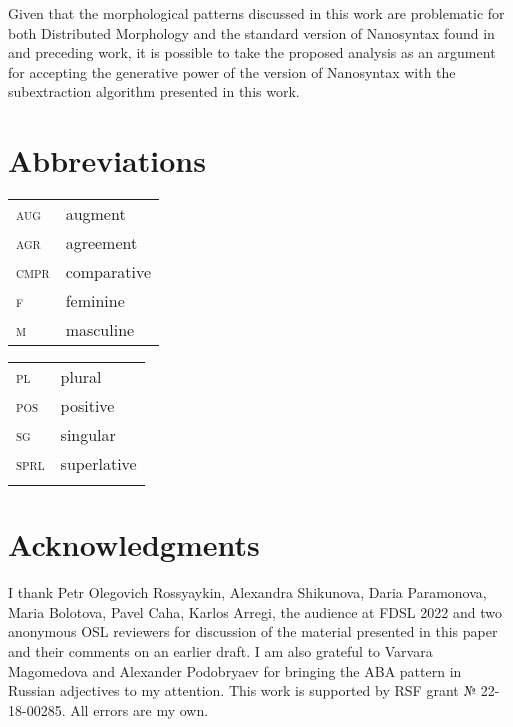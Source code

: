 \documentclass[output=paper,colorlinks,citecolor=brown]{langscibook}
\begin{document}
Given that the morphological patterns discussed in this work are problematic for both Distributed Morphology and the standard version of Nanosyntax found in \citet{Baunaz:2018} and preceding work, it is possible to take the proposed analysis as an argument for accepting the generative power of the version of Nanosyntax with the subextraction algorithm presented in this work.

\section*{Abbreviations}

\begin{tabularx}{.5\textwidth}{@{}lQ}
\textsc{aug}&augment        \\
\textsc{agr}&{agreement}    \\
\textsc{cmpr}&comparative   \\
\textsc{f}&feminine         \\
\textsc{m}&masculine        \\
\end{tabularx}%
\begin{tabularx}{.5\textwidth}{lQ@{}}
\textsc{pl}&plural        \\%
\textsc{pos}&positive       \\
\textsc{sg}&singular        \\
\textsc{sprl}&superlative   \\
&\\ %
\end{tabularx}


\section*{Acknowledgments}
I thank Petr Olegovich Rossyaykin, Alexandra Shikunova, Daria Paramonova, Maria Bolotova, Pavel Caha, Karlos Arregi, the audience at FDSL 2022 and two anonymous OSL reviewers for discussion of the material presented in this paper and their comments on an earlier draft. I am also grateful to Varvara Magomedova and Alexander Podobryaev for bringing the ABA pattern in Russian adjectives to my attention. This work is supported by RSF grant № 22-18-00285. All errors are my own.

\printbibliography[heading=subbibliography,notkeyword=this]
\end{document}
